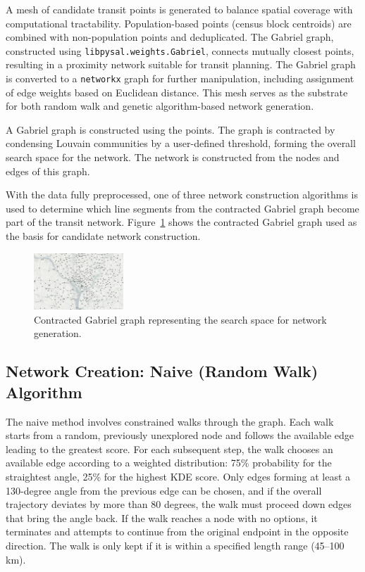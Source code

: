 \documentclass[sigconf,nonacm]{acmart}
\begin{document}
A mesh of candidate transit points is generated to balance spatial coverage with computational tractability. Population-based points (census block centroids) are combined with non-population points and deduplicated. The Gabriel graph, constructed using \texttt{libpysal.weights.Gabriel}, connects mutually closest points, resulting in a proximity network suitable for transit planning. The Gabriel graph is converted to a \texttt{networkx} graph for further manipulation, including assignment of edge weights based on Euclidean distance. This mesh serves as the substrate for both random walk and genetic algorithm-based network generation.

A Gabriel graph is constructed using the points. The graph is contracted by condensing Louvain communities by a user-defined threshold, forming the overall search space for the network. The network is constructed from the nodes and edges of this graph.

With the data fully preprocessed, one of three network construction algorithms is used to determine which line segments from the contracted Gabriel graph become part of the transit network. Figure~\ref{fig:contracted_gabriel} shows the contracted Gabriel graph used as the basis for candidate network construction.

\begin{figure}[h]
    \centering
    \includegraphics[width=0.3\textwidth]{./img/graph.png}
    \caption{Contracted Gabriel graph representing the search space for network generation.}
    \label{fig:contracted_gabriel}
\end{figure}


\subsection{Network Creation: Naive (Random Walk) Algorithm}

The naive method involves constrained walks through the graph. Each walk starts from a random, previously unexplored node and follows the available edge leading to the greatest score. For each subsequent step, the walk chooses an available edge according to a weighted distribution: 75\% probability for the straightest angle, 25\% for the highest KDE score. Only edges forming at least a 130-degree angle from the previous edge can be chosen, and if the overall trajectory deviates by more than 80 degrees, the walk must proceed down edges that bring the angle back. If the walk reaches a node with no options, it terminates and attempts to continue from the original endpoint in the opposite direction. The walk is only kept if it is within a specified length range (45--100 km).
\end{document}
